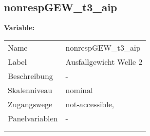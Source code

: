 	
	
	\subsection{nonrespGEW\_t3\_aip}
	\label{subSection:nonrespGEW_t3_aip}

	\noindent\textbf{Variable:}\\
		\begin{tabular}{lL{11.3cm}}
			\label{tableVariable:nonrespGEW_t3_aip}
			Name & nonrespGEW\_t3\_aip \\
			Label & Ausfallgewicht Welle 2 \\
			Beschreibung & - \\
			Skalenniveau & nominal \\
			Zugangswege &
				not-accessible,
 \\
			Panelvariablen & -
			 \\
			 \\
 \\
		\end{tabular}






	
	\newpage
